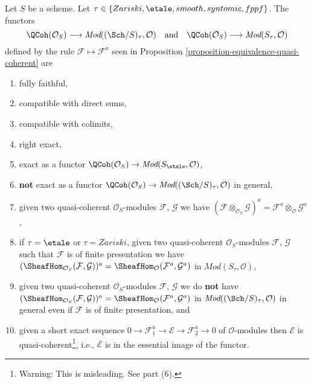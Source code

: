 \begin{lemma}
\label{lemma-equivalence-quasi-coherent-limits}
Let $S$ be a scheme.
Let $\tau \in \{Zariski, \linebreak[0] \etale,
\linebreak[0] smooth, \linebreak[0] syntomic, \linebreak[0] fppf\}$.
The functors
$$
\QCoh(\mathcal{O}_S)
\longrightarrow
\textit{Mod}((\Sch/S)_\tau, \mathcal{O})
\quad\text{and}\quad
\QCoh(\mathcal{O}_S)
\longrightarrow
\textit{Mod}(S_\tau, \mathcal{O})
$$
defined by the rule $\mathcal{F} \mapsto \mathcal{F}^a$ seen in
Proposition \ref{proposition-equivalence-quasi-coherent}
are
\begin{enumerate}
\item fully faithful,
\item compatible with direct sums,
\item compatible with colimits,
\item right exact,
\item exact as a functor
$\QCoh(\mathcal{O}_S) \to \textit{Mod}(S_\etale, \mathcal{O})$,
\item {\bf not} exact as a functor
$\QCoh(\mathcal{O}_S) \to
\textit{Mod}((\Sch/S)_\tau, \mathcal{O})$
in general,
\item given two quasi-coherent $\mathcal{O}_S$-modules
$\mathcal{F}$, $\mathcal{G}$ we have
$(\mathcal{F} \otimes_{\mathcal{O}_S} \mathcal{G})^a =
\mathcal{F}^a \otimes_\mathcal{O} \mathcal{G}^a$,
\item if $\tau = \etale$ or $\tau = Zariski$,
given two quasi-coherent $\mathcal{O}_S$-modules
$\mathcal{F}$, $\mathcal{G}$ such that $\mathcal{F}$
is of finite presentation we have
$(\SheafHom_{\mathcal{O}_S}(\mathcal{F}, \mathcal{G}))^a =
\SheafHom_\mathcal{O}(\mathcal{F}^a, \mathcal{G}^a)$ in
$\textit{Mod}(S_\tau, \mathcal{O})$,
\item given two quasi-coherent $\mathcal{O}_S$-modules
$\mathcal{F}$, $\mathcal{G}$ we do {\bf not} have
$(\SheafHom_{\mathcal{O}_S}(\mathcal{F}, \mathcal{G}))^a =
\SheafHom_\mathcal{O}(\mathcal{F}^a, \mathcal{G}^a)$
in $\textit{Mod}((\Sch/S)_\tau, \mathcal{O})$ in general
even if $\mathcal{F}$ is of finite presentation, and
\item given a short exact sequence
$0 \to \mathcal{F}_1^a \to \mathcal{E} \to \mathcal{F}_2^a \to 0$
of $\mathcal{O}$-modules then $\mathcal{E}$ is
quasi-coherent\footnote{Warning: This is misleading. See part (6).}, i.e.,
$\mathcal{E}$ is in the essential image of the functor.
\end{enumerate}
\end{lemma}


